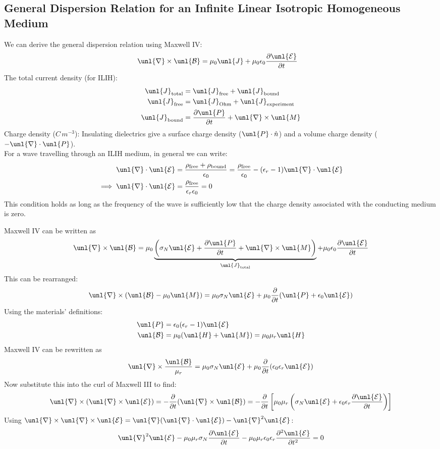 \documentclass[a4paper, 11pt, normalem]{report}
\newcommand\p{\partial}
\newcommand\E{\mathcal{E}}
\newcommand\uE{\unl{\E}}
\newcommand\B{\mathcal{B}}
\newcommand\uB{\unl{\B}}
\newcommand\del{\unl{\nabla}}
\newcommand\eno{\epsilon_0}
\newcommand\hn{\hat{n}}
\newcommand\J{\unl{J}}
\newcommand\M{\unl{M}}
\newcommand\er{\epsilon_r}
\begin{document}
\subsection{General Dispersion Relation for an Infinite Linear Isotropic Homogeneous Medium}
We can derive the general dispersion relation using Maxwell \RN{4}:
\begin{align*}
    \del\times\uB &= \mu_0\J + \mu_0\eno\frac{\p\uE}{\p t}
\end{align*}
The total current density (for ILIH):
\begin{align*}
    \J_{\text{total}} &= \J_{\text{free}} + \J_{\text{bound}} \\
    \J_{\text{free}} &= \J_{\text{Ohm}} + \J_{\text{experiment}} \\
    \J_{\text{bound}} &= \frac{\p \unl{P}}{\p t} + \del\times\M
\end{align*}
Charge density ($C\,m^{-3}$): Insulating dielectrics give a surface charge density ($\unl{P}\cdot\hn$) and a volume charge density ($-\del\cdot\unl{P}$).\\
For a wave travelling through an ILIH medium, in general we can write:
\begin{align*}
    \del\cdot\uE &= \frac{\rho_{\text{free}}+\rho_{\text{bound}}}{\eno} = \frac{\rho_{\text{free}}}{\eno} - (\er - 1)\del\cdot\uE \\
    \implies \del\cdot\uE &= \frac{\rho_{\text{free}}}{\er\eno} = 0
\end{align*}
This condition holds as long as the frequency of the wave is sufficiently low that the charge density associated with the conducting medium is zero.

Maxwell \RN{4} can be written as
\begin{equation*}
    \del\times\uB = \mu_0\underbrace{\left(\sigma_N \uE + \frac{\p \unl{P}}{\p t} + \del\times\M\right)}_{\J_{\text{total}}} + \mu_0\eno\frac{\p \uE}{\p t}
\end{equation*}
This can be rearranged:
\begin{align*}
    \del\times(\uB - \mu_0\M) = \mu_0\sigma_N\uE + \mu_0\frac{\p}{\p t}(\unl{P} + \eno\uE)
\end{align*}
Using the materials' definitions:
\begin{align*}
    \unl{P} &= \eno(\er - 1)\uE \\
    \uB &= \mu_0(\unl{H}+\M) = \mu_0\mu_r\unl{H}
\end{align*}
Maxwell \RN{4} can be rewritten as
\begin{equation*}
    \del\times\frac{\uB}{\mu_r} = \mu_0\sigma_N\uE + \mu_0\frac{\p}{\p t} (\eno\er\uE)
\end{equation*}
Now substitute this into the curl of Maxwell \RN{3} to find:
\begin{align*}
    \del\times(\del\times\uE) = -\frac{\p}{\p t}(\del\times\uB) = -\frac{\p}{\p t}\left[\mu_0\mu_r\left(\sigma_N\uE + \eno\er\frac{\p \uE}{\p t}\right)\right]
\end{align*}
Using $\del\times\del\times\uE = \del(\del\cdot\uE) - \del^2\uE$:
\begin{align*}
    \del^2\uE - \mu_0\mu_r\sigma_N\frac{\p \uE}{\p t} - \mu_0\mu_r\eno\er\frac{\p^2\uE}{\p t^2} = 0
\end{align*}
\end{document}
